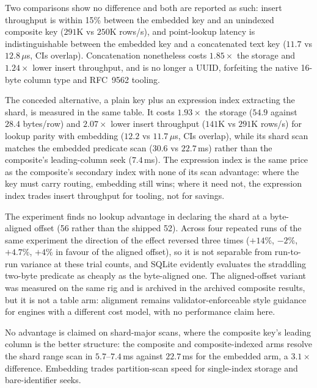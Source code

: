 \documentclass{svproc}
\begin{document}
Two comparisons show no difference and both are reported as such: insert
throughput is within 15\% between the embedded key and an
unindexed composite key ($291$K vs $250$K rows/s), and point-lookup latency is indistinguishable between the
embedded key and a concatenated text key ($11.7$ vs $12.8\,\mu$s, CIs
overlap). Concatenation nonetheless costs $1.85\times$ the storage and
$1.24\times$ lower insert throughput, and is no longer a UUID, forfeiting
the native 16-byte column type and RFC~9562 tooling.

The conceded alternative, a plain key plus an expression index
extracting the shard, is measured in the same table. It costs
$1.93\times$ the storage ($54.9$ against $28.4$ bytes/row) and
$2.07\times$ lower insert throughput ($141$K vs $291$K rows/s) for lookup
parity with embedding ($12.2$ vs $11.7\,\mu$s, CIs overlap), while its
shard scan matches the embedded predicate scan ($30.6$ vs $22.7$\,ms)
rather than the composite's leading-column seek ($7.4$\,ms). The
expression index is the same price as the composite's secondary index
with none of its scan advantage: where the key must carry routing,
embedding still wins; where it need not, the expression index trades
insert throughput for tooling, not for savings.

The experiment finds no lookup advantage in declaring the shard at a byte-aligned offset
(56 rather than the shipped 52). Across four repeated runs of the same
experiment the direction of the effect reversed three times ($+14\%$,
$-2\%$, $+4.7\%$, $+4\%$ in favour of the aligned offset), so it is
not separable from run-to-run variance at these trial counts, and SQLite
evidently evaluates the straddling two-byte predicate as cheaply as the
byte-aligned one. The aligned-offset variant was measured on the same rig
and is archived in the archived composite results, but it is
not a table arm: alignment remains validator-enforceable style guidance
for engines with a different cost model, with no performance claim here.

No advantage is claimed on shard-major scans, where the composite key's
leading column is the better structure: the composite and
composite-indexed arms resolve the shard range scan in $5.7$--$7.4$\,ms
against $22.7$\,ms for the embedded arm, a $3.1\times$ difference.
Embedding trades partition-scan speed for single-index storage and
bare-identifier seeks.
\end{document}
